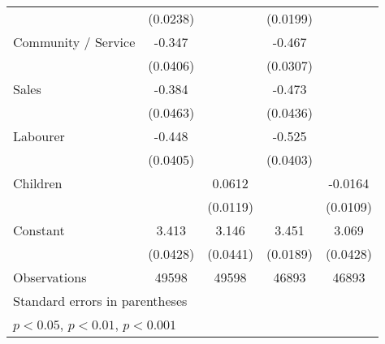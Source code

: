 {\begin{tabular}{l*{4}{c}}
                    &    (0.0238)         &                     &    (0.0199)         &                     \\
[1em]
Community / Service &      -0.347\sym{***}&                     &      -0.467\sym{***}&                     \\
                    &    (0.0406)         &                     &    (0.0307)         &                     \\
[1em]
Sales               &      -0.384\sym{***}&                     &      -0.473\sym{***}&                     \\
                    &    (0.0463)         &                     &    (0.0436)         &                     \\
[1em]
Labourer            &      -0.448\sym{***}&                     &      -0.525\sym{***}&                     \\
                    &    (0.0405)         &                     &    (0.0403)         &                     \\
[1em]
Children            &                     &      0.0612\sym{***}&                     &     -0.0164         \\
                    &                     &    (0.0119)         &                     &    (0.0109)         \\
[1em]
Constant            &       3.413\sym{***}&       3.146\sym{***}&       3.451\sym{***}&       3.069\sym{***}\\
                    &    (0.0428)         &    (0.0441)         &    (0.0189)         &    (0.0428)         \\
\hline
Observations        &       49598         &       49598         &       46893         &       46893         \\
\hline\hline
\multicolumn{5}{l}{\footnotesize Standard errors in parentheses}\\
\multicolumn{5}{l}{\footnotesize \sym{*} \(p<0.05\), \sym{**} \(p<0.01\), \sym{***} \(p<0.001\)}\\
\end{tabular}
}

